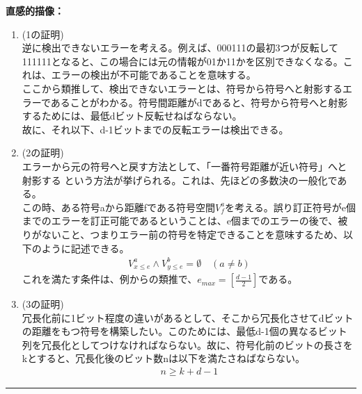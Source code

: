 \documentclass[a4paper,10.5pt]{article}
\numberwithin{equation}{section}
\newenvironment{intuitionbox}
{\begin{prooflabel}\textbf{直感的描像：}\end{prooflabel}\vspace{0.8em}}
{\par\vspace{1em}\hrule\vspace{1em}}
\begin{document}
\begin{intuitionbox}
    \begin{enumerate}
        \item (1の証明)\\
        逆に検出できないエラーを考える。例えば、000111の最初3つが反転して111111となると、この場合には元の情報が01か11かを区別できなくなる。これは、エラーの検出が不可能であることを意味する。\\
        ここから類推して、検出できないエラーとは、符号から符号へと射影するエラーであることがわかる。符号間距離がdであると、符号から符号へと射影するためには、最低dビット反転せねばならない。\\
        故に、それ以下、d-1ビットまでの反転エラーは検出できる。
        \item(2の証明)\\
        エラーから元の符号へと戻す方法として、「一番符号距離が近い符号」へと射影する
        という方法が挙げられる。これは、先ほどの多数決の一般化である。\\
        この時、ある符号aから距離fである符号空間$V^{a}_{f}$を考える。誤り訂正符号がe個までのエラーを訂正可能であるということは、e個までのエラーの後で、被りがないこと、つまりエラー前の符号を特定できることを意味するため、以下のように記述できる。
        \begin{align*}
            V^{a}_{x\leq e} \land V_{y\leq e}^{b} =\emptyset \quad(a\neq b)
        \end{align*}
        これを満たす条件は、例からの類推で、$e_{max}=[\frac{d-1}{2}]$である。
        \item(3の証明)\\
        冗長化前に1ビット程度の違いがあるとして、そこから冗長化させてdビットの距離をもつ符号を構築したい。このためには、最低d-1個の異なるビット列を冗長化としてつけなければならない。故に、符号化前のビットの長さをkとすると、冗長化後のビット数nは以下を満たさねばならない。
        \begin{align*}
            n\geq k+d-1
        \end{align*}
    \end{enumerate}
\end{intuitionbox}
\end{document}
